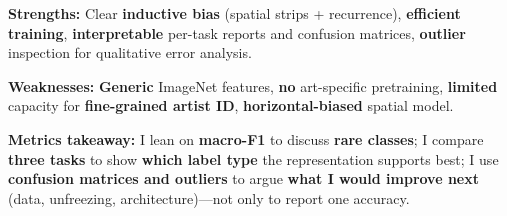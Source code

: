 \documentclass[11pt]{article}
\begin{document}
\textbf{Strengths:} Clear \textbf{inductive bias} (spatial strips +
recurrence), \textbf{efficient training}, \textbf{interpretable}
per-task reports and confusion matrices, \textbf{outlier} inspection for
qualitative error analysis.

\textbf{Weaknesses:} \textbf{Generic} ImageNet features, \textbf{no}
art-specific pretraining, \textbf{limited} capacity for
\textbf{fine-grained artist ID}, \textbf{horizontal-biased} spatial
model.

\textbf{Metrics takeaway:} I lean on \textbf{macro-F1} to discuss
\textbf{rare classes}; I compare \textbf{three tasks} to show
\textbf{which label type} the representation supports best; I use
\textbf{confusion matrices and outliers} to argue \textbf{what I would
improve next} (data, unfreezing, architecture)---not only to report one
accuracy.


    
    
    
\end{document}
